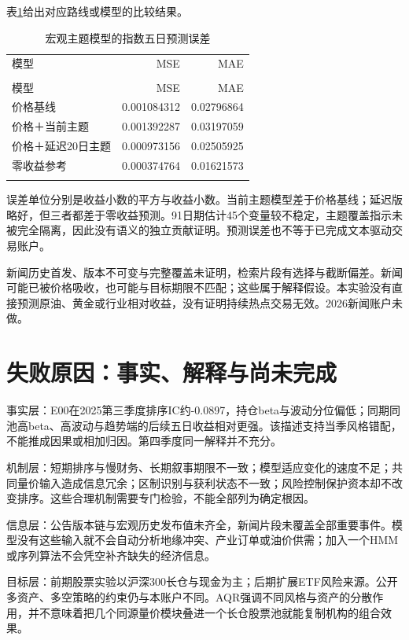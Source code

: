 \documentclass[12pt]{article}
\newcommand{\toprule}{\noalign{\hrule height .8pt}}
\newcommand{\midrule}{\noalign{\hrule height .4pt}}
\newcommand{\bottomrule}{\noalign{\hrule height .8pt}}
\begin{document}
表\ref{tab:nlp}给出对应路线或模型的比较结果。


{\small
\begin{longtable}{@{}lrr@{}}
\caption{宏观主题模型的指数五日预测误差}\label{tab:nlp}\\
\toprule
模型 & MSE & MAE \\
\midrule\endfirsthead
\multicolumn{3}{c}{表\thetable（续）}\\\toprule
模型 & MSE & MAE \\
\midrule\endhead
价格基线 & 0.001084312 & 0.02796864 \\
价格＋当前主题 & 0.001392287 & 0.03197059 \\
价格＋延迟20日主题 & 0.000973156 & 0.02505925 \\
零收益参考 & 0.000374764 & 0.01621573 \\
\bottomrule\end{longtable}}
误差单位分别是收益小数的平方与收益小数。当前主题模型差于价格基线；延迟版略好，但三者都差于零收益预测。91日期估计45个变量较不稳定，主题覆盖指示未被完全隔离，因此没有语义的独立贡献证明。预测误差也不等于已完成文本驱动交易账户。

新闻历史首发、版本不可变与完整覆盖未证明，检索片段有选择与截断偏差。新闻可能已被价格吸收，也可能与目标期限不匹配；这些属于解释假设。本实验没有直接预测原油、黄金或行业相对收益，没有证明持续热点交易无效。2026新闻账户未做。


\section{失败原因：事实、解释与尚未完成}
事实层：E00在2025第三季度排序IC约-0.0897，持仓beta与波动分位偏低；同期同池高beta、高波动与趋势端的后续五日收益相对更强。该描述支持当季风格错配，不能推成因果或相加归因。第四季度同一解释并不充分。

机制层：短期排序与慢财务、长期叙事期限不一致；模型适应变化的速度不足；共同量价输入造成信息冗余；区制识别与获利状态不一致；风险控制保护资本却不改变排序。这些合理机制需要专门检验，不能全部列为确定根因。

信息层：公告版本链与宏观历史发布值未齐全，新闻片段未覆盖全部重要事件。模型没有这些输入就不会自动分析地缘冲突、产业订单或油价供需；加入一个HMM或序列算法不会凭空补齐缺失的经济信息。

目标层：前期股票实验以沪深300长仓与现金为主；后期扩展ETF风险来源。公开多资产、多空策略的约束仍与本账户不同。AQR强调不同风格与资产的分散作用\cite{ref1}，并不意味着把几个同源量价模块叠进一个长仓股票池就能复制机构的组合效果。
\end{document}
